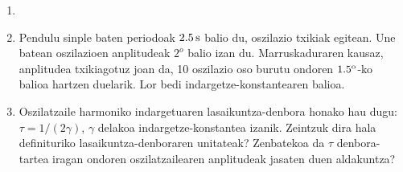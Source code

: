 \documentclass[12pt,twoside]{article}
\begin{document}
\begin{enumerate}
\item
{}

\item
 Pendulu sinple baten periodoak $2.5\,{\rm s}$ balio du, oszilazio
txikiak egitean. Une batean oszilazioen anplitudeak $2^o$ balio izan du.
Marruskaduraren kausaz, anplitudea txikiagotuz joan da, 10 oszilazio
oso burutu ondoren $1.5^{\rm o}$-ko balioa hartzen duelarik. Lor bedi
indargetze-konstantearen balioa.


\item
Oszilatzaile harmoniko indargetuaren lasaikuntza-denbora honako hau
dugu: $\tau=1/(2\gamma)$, $\gamma$ delakoa indargetze-konstantea izanik.
Zeintzuk dira hala definituriko lasaikuntza-denboraren unitateak? Zenbatekoa da
$\tau$ denbora-tartea iragan ondoren oszilatzailearen anplitudeak jasaten duen
aldakuntza?


\end{enumerate}
\end{document}
